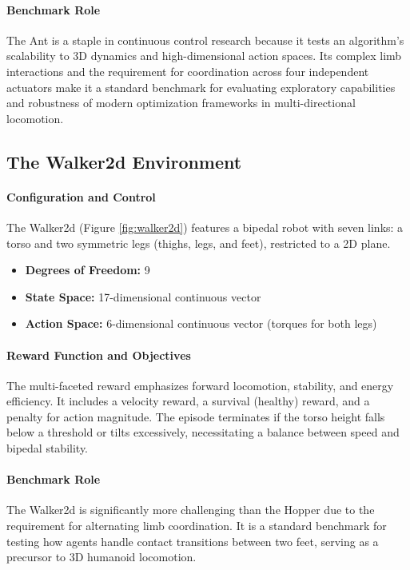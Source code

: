 \paragraph{Benchmark Role} 
The Ant is a staple in continuous control research because it tests an algorithm's scalability to 3D dynamics and high-dimensional action spaces. Its complex limb interactions and the requirement for coordination across four independent actuators make it a standard benchmark for evaluating exploratory capabilities and robustness of modern optimization frameworks in multi-directional locomotion.
%
\subsection{The Walker2d Environment}

\paragraph{Configuration and Control} 
The Walker2d (Figure \ref{fig:walker2d}) features a bipedal robot with seven links: a torso and two symmetric legs (thighs, legs, and feet), restricted to a 2D plane.

\begin{itemize}
    \item \textbf{Degrees of Freedom:} 9
    \item \textbf{State Space:} 17-dimensional continuous vector
    \item \textbf{Action Space:} 6-dimensional continuous vector (torques for both legs)
\end{itemize}

\paragraph{Reward Function and Objectives} 
The multi-faceted reward emphasizes forward locomotion, stability, and energy efficiency. It includes a velocity reward, a survival (healthy) reward, and a penalty for action magnitude. The episode terminates if the torso height falls below a threshold or tilts excessively, necessitating a balance between speed and bipedal stability.

\paragraph{Benchmark Role} 
The Walker2d is significantly more challenging than the Hopper due to the requirement for alternating limb coordination. It is a standard benchmark for testing how agents handle contact transitions between two feet, serving as a precursor to 3D humanoid locomotion.
%


